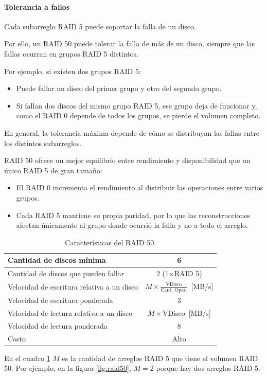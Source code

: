 \paragraph{Tolerancia a fallos}
Cada subarreglo RAID 5 puede soportar la falla de un disco.

Por ello, un RAID 50 puede tolerar la falla de más de un disco, siempre que las fallas ocurran en grupos RAID 5 distintos.

Por ejemplo, si existen dos grupos RAID 5:
\begin{itemize}
  \item Puede fallar un disco del primer grupo y otro del segundo grupo.
  \item Si fallan dos discos del mismo grupo RAID 5, ese grupo deja de funcionar y, como el RAID 0 depende de todos los grupos, se pierde el volumen completo.
\end{itemize}
En general, la tolerancia máxima depende de cómo se distribuyan las fallas entre los distintos subarreglos.

RAID 50 ofrece un mejor equilibrio entre rendimiento y disponibilidad que un único RAID 5 de gran tamaño:
\begin{itemize}
  \item El RAID 0 incrementa el rendimiento al distribuir las operaciones entre varios grupos.
  \item Cada RAID 5 mantiene su propia paridad, por lo que las reconstrucciones afectan únicamente al grupo donde ocurrió la falla y no a todo el arreglo.
\end{itemize}

\begin{table}[!ht]
  \centering
  \begin{tabular}{l|c}
    Cantidad de discos mínima & 6 \\\hline
    Cantidad de discos que pueden fallar & 2 (1\(\times\)RAID 5) \\ \hline
    Velocidad de escritura relativa a un disco & \(M\times\frac{\text{VDisco}}{\text{Cant. Oper.}}\)~[MB/s] \\\hline
    Velocidad de escritura ponderada & 3 \\ \hline
    Velocidad de lectura relativa a un disco & \(M\times\)VDisco~[MB/s] \\ \hline
    Velocidad de lectura ponderada & 8 \\ \hline
    Costo & Alto
  \end{tabular}
  \caption{Características del RAID 50.}
  \label{tab:raid50}
\end{table}

En el cuadro \ref{tab:raid50} \(M\) es la cantidad de arreglos RAID 5 que tiene el volumen RAID 50. Por ejemplo, en la figura \ref{fig:raid50}, \(M=2\) porque hay dos arreglos RAID 5.
